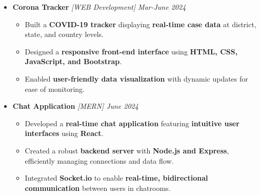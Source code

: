 \documentclass[a4paper,11pt]{article}
\begin{document}
\begin{itemize}

\vspace{0.0mm}
\item {\bf Corona Tracker} 
\textit{[WEB Development]}
\textit{\hfill {Mar-June 2024}}

\begin{itemize}

\vspace{-2mm}
\item Built a \textbf{COVID-19 tracker} displaying \textbf{real-time case data} at district, state, and country levels.
\item Designed a \textbf{responsive front-end interface} using \textbf{HTML, CSS, JavaScript, and Bootstrap}.
\item Enabled \textbf{user-friendly data visualization} with dynamic updates for ease of monitoring.

\vspace{-2mm}
\end{itemize}
\end{itemize}

\begin{itemize}

\item {\bf Chat Application} 
\textit{[MERN]}
\textit{\hfill {June 2024}}

\begin{itemize}

\vspace{-2mm}
\item Developed a \textbf{real-time chat application} featuring \textbf{intuitive user interfaces} using \textbf{React}.
\item Created a robust \textbf{backend server} with \textbf{Node.js and Express}, efficiently managing connections and data flow.
\item Integrated \textbf{Socket.io} to enable \textbf{real-time, bidirectional communication} between users in chatrooms.

\vspace{-2mm}
\end{itemize}
\end{itemize}
\end{document}
